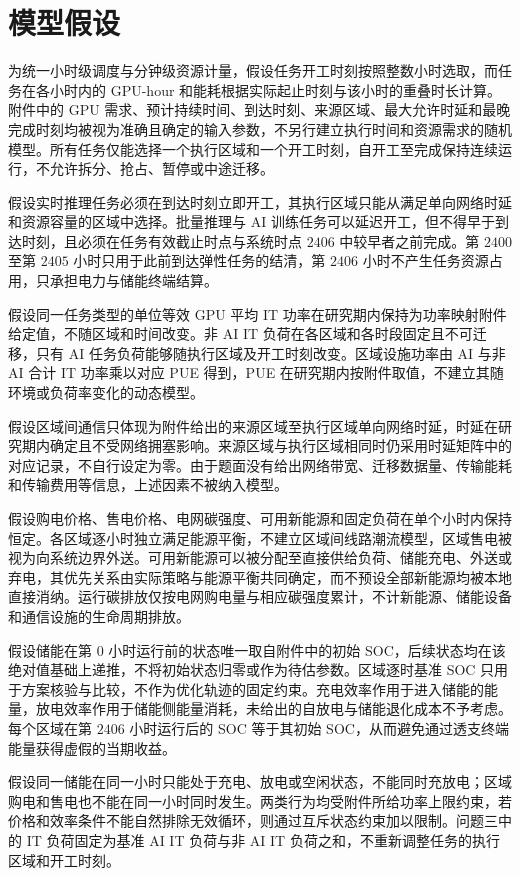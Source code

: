 \section{模型假设}

为统一小时级调度与分钟级资源计量，假设任务开工时刻按照整数小时选取，而任务在各小时内的 GPU-hour 和能耗根据实际起止时刻与该小时的重叠时长计算。附件中的 GPU 需求、预计持续时间、到达时刻、来源区域、最大允许时延和最晚完成时刻均被视为准确且确定的输入参数，不另行建立执行时间和资源需求的随机模型。所有任务仅能选择一个执行区域和一个开工时刻，自开工至完成保持连续运行，不允许拆分、抢占、暂停或中途迁移。

假设实时推理任务必须在到达时刻立即开工，其执行区域只能从满足单向网络时延和资源容量的区域中选择。批量推理与 AI 训练任务可以延迟开工，但不得早于到达时刻，且必须在任务有效截止时点与系统时点 $2406$ 中较早者之前完成。第 $2400$ 至第 $2405$ 小时只用于此前到达弹性任务的结清，第 $2406$ 小时不产生任务资源占用，只承担电力与储能终端结算。

假设同一任务类型的单位等效 GPU 平均 IT 功率在研究期内保持为功率映射附件给定值，不随区域和时间改变。非 AI IT 负荷在各区域和各时段固定且不可迁移，只有 AI 任务负荷能够随执行区域及开工时刻改变。区域设施功率由 AI 与非 AI 合计 IT 功率乘以对应 PUE 得到，PUE 在研究期内按附件取值，不建立其随环境或负荷率变化的动态模型。

假设区域间通信只体现为附件给出的来源区域至执行区域单向网络时延，时延在研究期内确定且不受网络拥塞影响。来源区域与执行区域相同时仍采用时延矩阵中的对应记录，不自行设定为零。由于题面没有给出网络带宽、迁移数据量、传输能耗和传输费用等信息，上述因素不被纳入模型。

假设购电价格、售电价格、电网碳强度、可用新能源和固定负荷在单个小时内保持恒定。各区域逐小时独立满足能源平衡，不建立区域间线路潮流模型，区域售电被视为向系统边界外送。可用新能源可以被分配至直接供给负荷、储能充电、外送或弃电，其优先关系由实际策略与能源平衡共同确定，而不预设全部新能源均被本地直接消纳。运行碳排放仅按电网购电量与相应碳强度累计，不计新能源、储能设备和通信设施的生命周期排放。

假设储能在第 $0$ 小时运行前的状态唯一取自附件中的初始 SOC，后续状态均在该绝对值基础上递推，不将初始状态归零或作为待估参数。区域逐时基准 SOC 只用于方案核验与比较，不作为优化轨迹的固定约束。充电效率作用于进入储能的能量，放电效率作用于储能侧能量消耗，未给出的自放电与储能退化成本不予考虑。每个区域在第 $2406$ 小时运行后的 SOC 等于其初始 SOC，从而避免通过透支终端能量获得虚假的当期收益。

假设同一储能在同一小时只能处于充电、放电或空闲状态，不能同时充放电；区域购电和售电也不能在同一小时同时发生。两类行为均受附件所给功率上限约束，若价格和效率条件不能自然排除无效循环，则通过互斥状态约束加以限制。问题三中的 IT 负荷固定为基准 AI IT 负荷与非 AI IT 负荷之和，不重新调整任务的执行区域和开工时刻。

